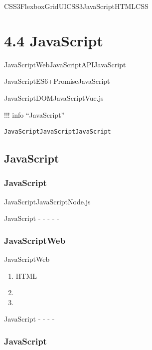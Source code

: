 CSS3FlexboxGridUICSS3JavaScriptHTMLCSS

\hypertarget{javascript-1}{%
\section{4.4 JavaScript}\label{javascript-1}}

JavaScriptWebJavaScriptAPIJavaScript

JavaScriptES6+PromiseJavaScript

JavaScriptDOMJavaScriptVue.js

!!! info ``JavaScript''

\begin{verbatim}
JavaScriptJavaScriptJavaScript
\end{verbatim}

\hypertarget{javascript-2}{%
\subsection{JavaScript}\label{javascript-2}}

\hypertarget{javascript-3}{%
\subsubsection{JavaScript}\label{javascript-3}}

JavaScript\important{}JavaScriptNode.js

JavaScript - \important{} - \important{} - \important{} - \important{} -
\important{}

\hypertarget{javascriptweb}{%
\subsubsection{JavaScriptWeb}\label{javascriptweb}}

JavaScriptWeb

\begin{enumerate}
\def\labelenumi{\arabic{enumi}.}
\item
  HTML
\item
  \important{}
\item
  \important{}
\end{enumerate}

JavaScript - - - -

\hypertarget{javascript-4}{%
\subsubsection{JavaScript}\label{javascript-4}}

